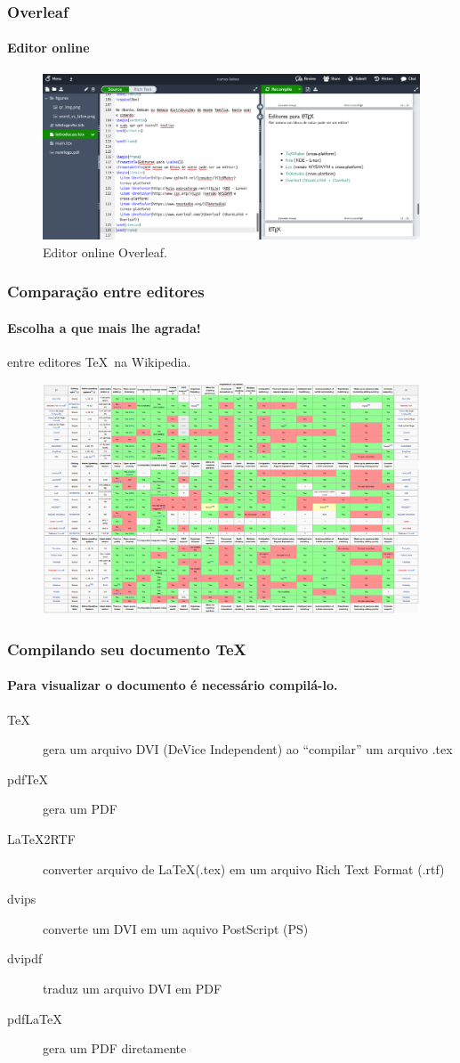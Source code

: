\begin{frame}
\frametitle{Overleaf}
\framesubtitle{Editor online}
\begin{figure}
    \centering
    \includegraphics[width=\textwidth]{figures/overleaf.png}
    \caption{Editor online Overleaf.}
    \label{fig:overleaf}
\end{figure}
\end{frame}


\begin{frame}
\frametitle{Comparação entre editores}
\framesubtitle{Escolha a que mais lhe agrada!}
   entre editores \TeX \ na Wikipedia.

  \begin{figure}[h!]
  \centering
  \includegraphics[width=\textwidth]{figures/editorschart.png}
  \label{fig:editorschart}
  \end{figure}
\end{frame}

\begin{frame}
\frametitle{Compilando seu documento \TeX{}}
\framesubtitle{Para visualizar o documento é necessário compilá-lo.}
   \begin{description}
   \item[\TeX] gera um arquivo DVI (DeVice Independent) ao ``compilar'' um arquivo .tex
   \item[pdfTeX] gera um PDF
   \item[LaTeX2RTF] converter arquivo de \LaTeX (.tex) em um arquivo  Rich Text Format (.rtf)
   \item[dvips] converte um DVI em um aquivo PostScript (PS)
   \item[dvipdf] traduz um arquivo DVI em PDF
   \item[pdfLaTeX] gera um PDF diretamente
   \end{description}
\end{frame}

